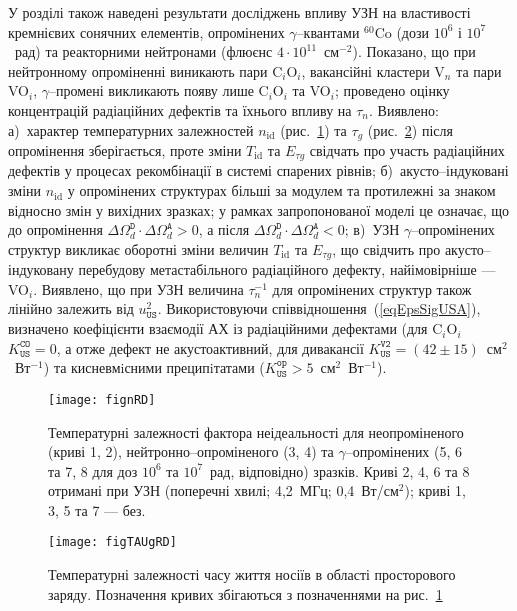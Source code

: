 У розділі також наведені результати досліджень впливу УЗН на властивості кремнієвих сонячних елементів,
опромінених $\gamma$--квантами $^{60}$Co (дози $10^6$ і $10^7$~рад) та реакторними нейтронами (флюєнс $4\cdot10^{11}$~см$^{-2}$).
Показано, що при нейтронному опроміненні виникають пари C$_i$O$_i$,
вакансійні кластери V$_n$ та пари VO$_i$, $\gamma$--промені викликають появу лише C$_i$O$_i$ та VO$_i$;
проведено оцінку концентрацій радіаційних дефектів та їхнього впливу на $\tau_n$.
Виявлено:
а)~характер температурних залежностей  $n_\mathrm{id}$ (рис.~\ref{fignRD}) та $\tau_{g}$ (рис.~\ref{figTAUgRD})
після опромінення зберігається, проте зміни $T_{\mathrm{id}}$ та $E_{\tau g}$ свідчать про участь радіаційних дефектів у процесах рекомбінації в системі спарених рівнів;
б)~акусто--індуковані зміни $n_\mathrm{id}$ у опромінених структурах більші за модулем та протилежні за знаком відносно змін у вихідних зразках;
у рамках запропонованої моделі 
це означає, що до опромінення $\Delta\Omega_d^\mathtt{D}\cdot\Delta\Omega_d^\mathtt{A}>0$, а після $\Delta\Omega_d^\mathtt{D}\cdot\Delta\Omega_d^\mathtt{A}<0$;
в)~УЗН $\gamma$--опромінених структур викликає оборотні зміни величин $T_{\mathrm{id}}$ та $E_{\tau g}$,
що свідчить про акусто--індуковану перебудову метастабільного радіаційного дефекту, найімовірніше --- VO$_i$.
Виявлено, що при УЗН величина $\tau_n^{-1}$ для опромінених структур також лінійно залежить від $u_{\mathtt{US}}^2$.
Використовуючи співвідношення~(\ref{eqEpsSigUSA}), визначено коефіцієнти взаємодії АХ із радіаційними дефектами (для C$_i$O$_i$ $K_\mathtt{US}^\mathtt{CO}=0$, а отже дефект не акустоактивний,
для дивакансії $K_\mathtt{US}^\mathtt{V2}=(42\pm15)$~см$^2$~Вт$^{-1}$)
та кисневмiсними преципiтатами ($K_\mathtt{US}^\mathtt{op}>5$~см$^2$~Вт$^{-1}$).

\begin{figure}[h]
\center
\texttt{[image: fignRD]}%
\caption{\label{fignRD}
Температурні залежності фактора неідеальності
для неопроміненого (криві 1, 2),
нейтронно--опроміненого (3, 4) та
$\gamma$--опромінених (5, 6 та 7, 8 для доз $10^6$ та $10^7$~рад, відповідно)
зразків.
Криві 2, 4, 6 та 8 отримані при УЗН (поперечні хвилі; 4,2~МГц; 0,4~Вт/см$^2$);
криві 1, 3, 5 та 7 --- без.
}%
\end{figure}
\begin{figure}[h]
\center
\texttt{[image: figTAUgRD]}%
\caption{\label{figTAUgRD}
Температурні залежності часу життя носіїв в області просторового заряду.
Позначення кривих збігаються з позначеннями на рис.~\ref{fignRD}
}%
\end{figure}




